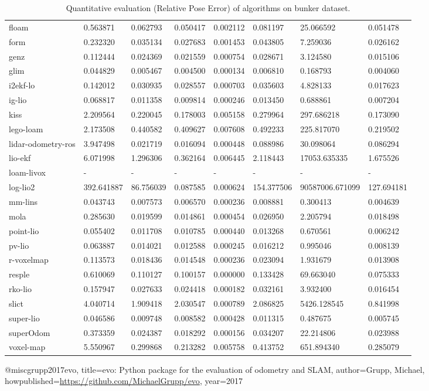 \begin{table}[]
{\begin{tabular}{llllllll}
		floam & 0.563871 & 0.062793 & 0.050417 & 0.002112 & 0.081197 & 25.066592 & 0.051478 \\
		form & 0.232320 & 0.035134 & 0.027683 & 0.001453 & 0.043805 & 7.259036 & 0.026162 \\
		genz & 0.112444 & 0.024369 & 0.021559 & 0.000754 & 0.028671 & 3.124580 & 0.015106 \\
		glim & 0.044829 & 0.005467 & 0.004500 & 0.000134 & 0.006810 & 0.168793 & 0.004060 \\
		i2ekf-lo & 0.142012 & 0.030935 & 0.028557 & 0.000703 & 0.035603 & 4.828133 & 0.017623 \\
		ig-lio & 0.068817 & 0.011358 & 0.009814 & 0.000246 & 0.013450 & 0.688861 & 0.007204 \\
		kiss & 2.209564 & 0.220045 & 0.178003 & 0.005158 & 0.279964 & 297.686218 & 0.173090 \\
		lego-loam & 2.173508 & 0.440582 & 0.409627 & 0.007608 & 0.492233 & 225.817070 & 0.219502 \\
		lidar-odometry-ros & 3.947498 & 0.021719 & 0.016094 & 0.000448 & 0.088986 & 30.098064 & 0.086294 \\
		lio-ekf & 6.071998 & 1.296306 & 0.362164 & 0.006445 & 2.118443 & 17053.635335 & 1.675526 \\
		loam-livox & - & - & - & - & - & - & - \\
		log-lio2 & 392.641887 & 86.756039 & 0.087585 & 0.000624 & 154.377506 & 90587006.671099 & 127.694181 \\
		mm-lins & 0.043743 & 0.007573 & 0.006570 & 0.000236 & 0.008881 & 0.300413 & 0.004639 \\
		mola & 0.285630 & 0.019599 & 0.014861 & 0.000454 & 0.026950 & 2.205794 & 0.018498 \\
		point-lio & 0.055402 & 0.011708 & 0.010785 & 0.000440 & 0.013268 & 0.670561 & 0.006242 \\
		pv-lio & 0.063887 & 0.014021 & 0.012588 & 0.000245 & 0.016212 & 0.995046 & 0.008139 \\
		r-voxelmap & 0.113573 & 0.018436 & 0.014548 & 0.000236 & 0.023094 & 1.931679 & 0.013908 \\
		resple & 0.610069 & 0.110127 & 0.100157 & 0.000000 & 0.133428 & 69.663040 & 0.075333 \\
		rko-lio & 0.157947 & 0.027633 & 0.024418 & 0.000182 & 0.032161 & 3.932400 & 0.016454 \\
		slict & 4.040714 & 1.909418 & 2.030547 & 0.000789 & 2.086825 & 5426.128545 & 0.841998 \\
		super-lio & 0.046586 & 0.009748 & 0.008582 & 0.000428 & 0.011315 & 0.487675 & 0.005745 \\
		superOdom & 0.373359 & 0.024387 & 0.018292 & 0.000156 & 0.034207 & 22.214806 & 0.023988 \\
		voxel-map & 5.550967 & 0.299868 & 0.213282 & 0.005758 & 0.413752 & 651.894340 & 0.285079 \\
        	\end{tabular}%
        }
        	\caption{Quantitative evaluation (Relative Pose Error\cite{grupp2017evo}) of algorithms on bunker dataset.}
        	\label{table3}
\end{table}

@misc{grupp2017evo,
  title={evo: Python package for the evaluation of odometry and SLAM},
  author={Grupp, Michael},
  howpublished={\url{https://github.com/MichaelGrupp/evo}},
  year={2017}
}
